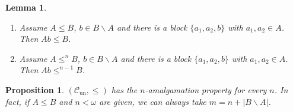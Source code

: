 \documentclass[10pt,a4paper]{article}
\newcommand{\Cun}{\mathcal{C}_\mathrm{un}}
\theoremstyle{note}
\newtheorem{lemma}[thm]{Lemma}
\newtheorem{prop}[thm]{Proposition}
\begin{document}
\begin{lemma}\label{Feb_23_2024_1}\begin{enumerate}
			\item Assume $A\leq B$, $ b\in B\smallsetminus A$ and there is a block $\{a_1,a_2,b\}$  with  $a_1,a_2\in A$. Then  $Ab\leq B$.
			\item Assume $A\leq^n B$, $b\in B\smallsetminus A$ and there is a block $\{a_1,a_2,b\}$  with  $a_1,a_2\in A$. Then  $Ab\leq^{n-1} B$.
		\end{enumerate}
	\end{lemma}

	\begin{prop}\label{Feb_23_2024_2} $(\Cun,\leq)$ has the $n$-amalgamation property for every $n$.  In fact, if $A\leq B$ and $n<\omega$ are given, we can always take $m= n+|B\smallsetminus A|$.
	\end{prop}
\end{document}

